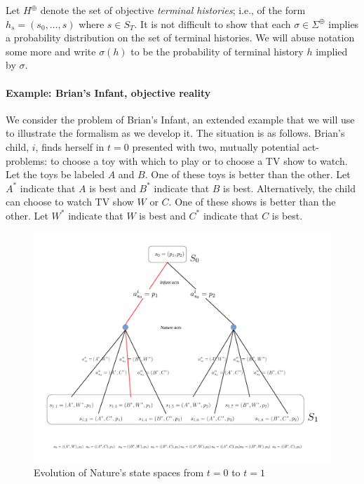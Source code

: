 \documentclass[
11pt,
titlepage,
reqno,
]{article}%
\theoremstyle{definition}
\begin{document}
Let $H^\oplus$ denote the set of objective \textit{terminal histories}; i.e., of the form $h_s=(s_0,\ldots,s)$ where $s\in S_T$.
It is not difficult to show that each $\sigma\in\Sigma^\oplus$ implies a probability distribution on the set of terminal histories.
We will abuse notation some more and write $\sigma(h)$ to be the probability of terminal history $h$ implied by $\sigma$.
		
\paragraph{Example: Brian's Infant, objective reality}	
We consider the problem of Brian's Infant, an extended example that we will use  to illustrate the formalism as we develop it.
The situation is as follows.
Brian's child, $i$, finds herself in $t=0$ presented with two, mutually potential act-problems: to choose a toy with which to play or to choose a TV show to watch. 
Let the toys be labeled $A$ and $B$. 
One of these toys is better than the other. 
Let $A^\ast$ indicate that $A$ is best and $B^\ast$ indicate that $B$ is best. 
Alternatively, the child can choose to watch TV show $W$ or $C$.
One of these shows is better than the other. 
Let $W^\ast$ indicate that $W$ is best and $C^\ast$ indicate that $C$ is best.


\begin{figure}[h!]
	\centering
	\includegraphics*[page=1,trim = 0in 1in 0in 0in,scale=.6]{Awareness_Diagrams_All}
	\caption{Evolution of Nature's state spaces from $t=0$ to $t=1$\label{Diag: p-01}}%
\end{figure}
\end{document}
